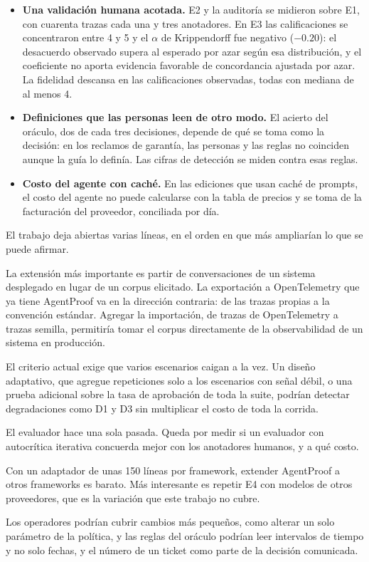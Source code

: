 \begin{itemize}[leftmargin=0.5in,itemsep=0pt,parsep=0pt,topsep=0pt]
  \item \textbf{Una validación humana acotada.} E2 y la auditoría se midieron sobre E1, con cuarenta trazas cada una y tres anotadores. En E3 las calificaciones se concentraron entre 4 y 5 y el $\alpha$ de Krippendorff fue negativo ($-0.20$): el desacuerdo observado supera al esperado por azar según esa distribución, y el coeficiente no aporta evidencia favorable de concordancia ajustada por azar. La fidelidad descansa en las calificaciones observadas, todas con mediana de al menos 4.
  \item \textbf{Definiciones que las personas leen de otro modo.} El acierto del oráculo, dos de cada tres decisiones, depende de qué se toma como la decisión: en los reclamos de garantía, las personas y las reglas no coinciden aunque la guía lo definía. Las cifras de detección se miden contra esas reglas.
  \item \textbf{Costo del agente con caché.} En las ediciones que usan caché de prompts, el costo del agente no puede calcularse con la tabla de precios y se toma de la facturación del proveedor, conciliada por día.
\end{itemize}
\par

El trabajo deja abiertas varias líneas, en el orden en que más ampliarían lo que se puede afirmar.
\par
{} La extensión más importante es partir de conversaciones de un sistema desplegado en lugar de un corpus elicitado. La exportación a OpenTelemetry que ya tiene AgentProof va en la dirección contraria: de las trazas propias a la convención estándar. Agregar la importación, de trazas de OpenTelemetry a trazas semilla, permitiría tomar el corpus directamente de la observabilidad de un sistema en producción.
\par
{} El criterio actual exige que varios escenarios caigan a la vez. Un diseño adaptativo, que agregue repeticiones solo a los escenarios con señal débil, o una prueba adicional sobre la tasa de aprobación de toda la suite, podrían detectar degradaciones como D1 y D3 sin multiplicar el costo de toda la corrida.
\par
{} El evaluador hace una sola pasada. Queda por medir si un evaluador con autocrítica iterativa concuerda mejor con los anotadores humanos, y a qué costo.
\par
{} Con un adaptador de unas 150 líneas por framework, extender AgentProof a otros frameworks es barato. Más interesante es repetir E4 con modelos de otros proveedores, que es la variación que este trabajo no cubre.
\par
{} Los operadores podrían cubrir cambios más pequeños, como alterar un solo parámetro de la política, y las reglas del oráculo podrían leer intervalos de tiempo y no solo fechas, y el número de un ticket como parte de la decisión comunicada.
\par
\endgroup
